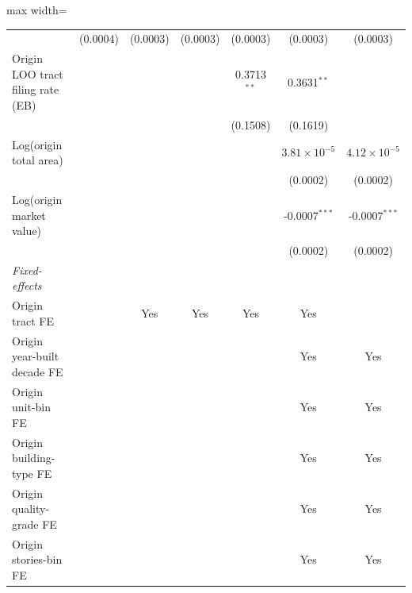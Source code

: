\documentclass[
  11pt,
]{article}
\begin{document}
\begin{adjustbox}{max width=\textwidth}
\begin{tabular}{lcccccc}
                                                  & (0.0004)               & (0.0003)       & (0.0003)       & (0.0003)       & (0.0003)              & (0.0003)\\   
   Origin LOO tract filing rate (EB)              &                        &                &                & 0.3713$^{**}$  & 0.3631$^{**}$         &   \\   
                                                  &                        &                &                & (0.1508)       & (0.1619)              &   \\   
   Log(origin total area)                         &                        &                &                &                & $3.81\times 10^{-5}$  & $4.12\times 10^{-5}$\\    
                                                  &                        &                &                &                & (0.0002)              & (0.0002)\\   
   Log(origin market value)                       &                        &                &                &                & -0.0007$^{***}$       & -0.0007$^{***}$\\   
                                                  &                        &                &                &                & (0.0002)              & (0.0002)\\   
   \midrule
   \emph{Fixed-effects}\\
   Origin tract FE                                &                        & Yes            & Yes            & Yes            & Yes                   & \\  
   Origin year-built decade FE                    &                        &                &                &                & Yes                   & Yes\\  
   Origin unit-bin FE                             &                        &                &                &                & Yes                   & Yes\\  
   Origin building-type FE                        &                        &                &                &                & Yes                   & Yes\\  
   Origin quality-grade FE                        &                        &                &                &                & Yes                   & Yes\\  
   Origin stories-bin FE                          &                        &                &                &                & Yes                   & Yes\\  

\end{tabular}
\end{adjustbox}
\end{document}
